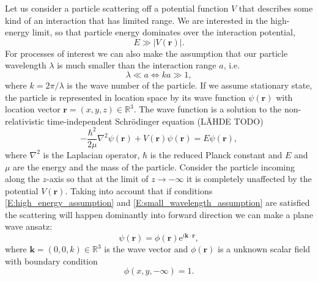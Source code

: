 \documentclass[a4paper, twoside, english, 12pt]{article}
\begin{document}
Let us consider a particle scattering off a potential function $V$ that describes some kind of an interaction that has limited range. We are interested in the high-energy limit, so that particle energy dominates over the interaction potential,
\begin{equation}\label{E:high_energy_assumption}
	E\gg|V(\mathbf{r})|.
\end{equation} 
For processes of interest we can also make the assumption that our particle wavelength $\lambda$ is much smaller than the interaction range $a$, i.e.
\begin{equation}\label{E:small_wavelength_assumption}
	\lambda \ll a \iff ka\gg 1,
\end{equation}
where $k=2\pi/\lambda$ is the wave number of the particle. If we assume stationary state, the particle is represented in location space by its wave function $\psi(\mathbf{r})$ with location vector $\mathbf{r}=(x,y,z) \in \mathbb{R}^3$. The wave function is a solution to the non-relativistic time-independent Schrödinger equation (LÄHDE TODO)
\begin{equation}\label{E:schrode}
	-\frac{\hbar^2}{2\mu}\nabla^2\psi(\mathbf{r}) + V(\mathbf{r})\psi(\mathbf{r}) = E\psi(\mathbf{r}),
\end{equation}
where $\nabla^2$ is the Laplacian operator, $\hbar$ is the reduced Planck constant and $E$ and $\mu$ are the energy and the mass of the particle. Consider the particle incoming along the $z$-axis so that at the limit of $z \to -\infty$ it is completely unaffected by the potential $V(\mathbf{r})$. Taking into account that if conditions \ref{E:high_energy_assumption} and \ref{E:small_wavelength_assumption} are satisfied the scattering will happen dominantly into forward direction we can make a plane wave ansatz:
\begin{equation}\label{E:planewave}
	\psi(\mathbf{r}) = \phi(\mathbf{r})\mathrm{e}^{i \mathbf{k}\cdot\mathbf{r}},
\end{equation}
where $\mathbf{k}=(0,0,k)\in \mathbb{R}^3$ is the wave vector and $\phi(\mathbf{r})$ is a unknown scalar field with boundary condition
\begin{equation}\label{E:BC_for_phi}
\phi(x,y,-\infty)=1.
\end{equation}
\end{document}
